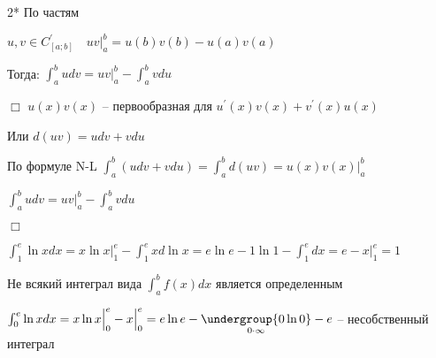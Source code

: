 \documentclass[12pt]{article}
\begin{document}
    2* \hypertarget{integralbyparts}{По частям}

    \Th $u, v \in C^\prime_{[a;b]} \quad uv \Big|_a^b = u(b)v(b) - u(a)v(a)$

    Тогда: $\int^b_a udv = uv \Big|_a^b - \int^b_a vdu$

    $\Box$
            $u(x)v(x)$ -- первообразная для $u^\prime(x)v(x) + v^\prime(x)u(x)$


    Или $d(uv) = udv + vdu$

    По формуле N-L $\int_a^b (udv + vdu) = \int^b_a d(uv) = u(x)v(x) \Big|^b_a$

    $\int_a^b udv = uv \Big|^b_a - \int^b_a vdu$

    $\Box$

    \Ex $\int_1^e \ln x dx = x \ln x \Big|^e_1 - \int^e_1 xd\ln x = e \ln e - 1 \ln 1 -
    \int^e_1 dx = e - x \Big|_1^e = 1$

    \Nota Не всякий интеграл вида $\int^b_a f(x) dx $ является определенным



        \Ex $\int^e_0 \ln x dx = x \ln x \Big|_0^e - x \Big|_0^e = e \ln e - \underset{0 \cdot \infty}{\undergroup{0 \ln 0}} - e$ -- несобственный интеграл
\end{document}
